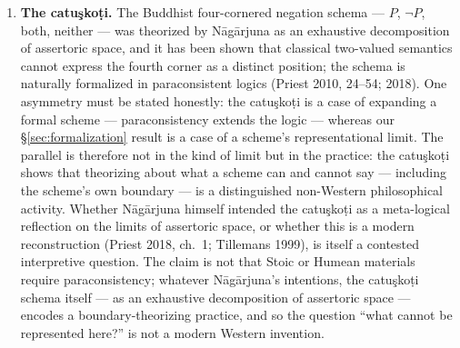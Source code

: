 \documentclass[11pt]{article}
\theoremstyle{plain}
\theoremstyle{definition}
\theoremstyle{remark}
\begin{document}
\begin{enumerate}
\item[(a)] \textbf{The catu\c{s}ko\d{t}i.} The Buddhist four-cornered
negation schema --- $P$, $\neg P$, both, neither --- was theorized by
N\=ag\=arjuna as an exhaustive decomposition of assertoric space, and
it has been shown that classical two-valued semantics cannot express
the fourth corner as a distinct position; the schema is naturally
formalized in paraconsistent logics (Priest 2010, 24--54; 2018). One
asymmetry must be stated honestly: the catu\c{s}ko\d{t}i is a case of
expanding a formal scheme --- paraconsistency extends the logic ---
whereas our \S\ref{sec:formalization} result is a case of a scheme's
representational limit. The parallel is therefore not in the kind of
limit but in the practice: the catu\c{s}ko\d{t}i shows that theorizing
about what a scheme can and cannot say --- including the scheme's own
boundary --- is a distinguished non-Western philosophical activity.
Whether N\=ag\=arjuna himself intended the catu\c{s}ko\d{t}i as a
meta-logical reflection on the limits of assertoric space, or whether
this is a modern reconstruction (Priest 2018, ch.~1; Tillemans 1999),
is itself a contested interpretive question. The claim is not that
Stoic or Humean materials require paraconsistency; whatever
N\=ag\=arjuna's intentions, the catu\c{s}ko\d{t}i schema itself --- as
an exhaustive decomposition of assertoric space --- encodes a
boundary-theorizing practice, and so the question ``what cannot be
represented here?'' is not a modern Western invention.


\end{enumerate}
\end{document}
